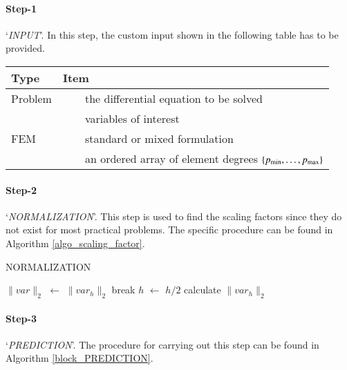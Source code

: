 \documentclass[review,3p]{elsarticle}
\newcommand{\tabitem}{~~\llap{\textbullet}~~}           %
\begin{document}
\paragraph{Step-1} `\textit{INPUT}'. In this step, the custom input shown in the following table has to be provided.

\begin{table}[!ht]
\label{settings_algorithm}
  \centering
  \begin{tabular}{l L{10cm}}
    \toprule
    Type & Item  \\
    \midrule
    Problem & \tabitem the differential equation to be solved \\
     		& \tabitem variables of interest \\ \hline
    FEM     & \tabitem standard or mixed formulation \\
    		& \tabitem an ordered array of element degrees $\{p_{\min}, \ldots, p_{\rm max}\}$ \\
    \bottomrule
  \end{tabular}
\end{table}

\paragraph{Step-2} `\textit{NORMALIZATION}'. This step is used to find the scaling factors since they do not exist for most practical problems. The specific procedure can be found in Algorithm \ref{algo_scaling_factor}.

\vspace{0.2cm}
\begin{algorithm}[H]
\caption{NORMALIZATION}
\label{algo_scaling_factor}
{
    {
        $\|var\|_{2}$ $\gets$ $\|var_{h}\|_{2}$\;
        break\;
    }
    {
        $h$ $\gets$ $h/2$\;
        calculate $\|var_h\|_{2}$\;    
    }
}
\end{algorithm}
                                                                   
\paragraph{Step-3} `\textit{PREDICTION}'. The procedure for carrying out this step can be found in Algorithm \ref{block_PREDICTION}.
\end{document}
